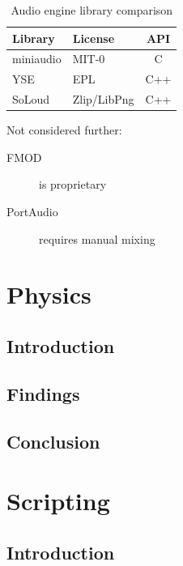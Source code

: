 \documentclass{projdoc}
\begin{document}

\begin{table}
	\centering
	\begin{tabular}{llc}
		\toprule
		\textbf{Library} & \textbf{License} & \textbf{API}\\
		\midrule
		miniaudio & MIT-0 & C\\
		YSE & EPL & C++\\
		SoLoud & Zlip/LibPng & C++\\
		\bottomrule
	\end{tabular}
	\caption{Audio engine library comparison}
	\label{tab:audio-engines}
\end{table}

Not considered further:
\begin{description}
	\item[FMOD] is proprietary
	\item[PortAudio] requires manual mixing
\end{description}

\section{Physics}

\subsection{Introduction}

\subsection{Findings}

\subsection{Conclusion}

\section{Scripting}

\subsection{Introduction}
\end{document}
